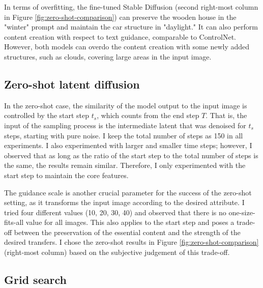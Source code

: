 In terms of overfitting, the fine-tuned Stable Diffusion (second right-most column in Figure \ref{fig:zero-shot-comparison}) can preserve the wooden house in the "winter" prompt and maintain the car structure in "daylight." It can also perform content creation with respect to text guidance, comparable to ControlNet. However, both models can overdo the content creation with some newly added structures, such as clouds, covering large areas in the input image.

\subsection{Zero-shot latent diffusion}
In the zero-shot case, the similarity of the model output to the input image is controlled by the start step  $t_s$, which counts from the end step  $T$. That is, the input of the sampling process is the intermediate latent that was denoised for $t_s$ steps, starting with pure noise. I keep the total number of steps as 150 in all experiments. I also experimented with larger and smaller time steps; however, I observed that as long as the ratio of the start step to the total number of steps is the same, the results remain similar. Therefore, I only experimented with the start step to maintain the core features.


The guidance scale is another crucial parameter for the success of the zero-shot setting, as it transforms the input image according to the desired attribute. I tried four different values (10, 20, 30, 40) and observed that there is no one-size-fits-all value for all images. This also applies to the start step and poses a trade-off between the preservation of the essential content and the strength of the desired transfers. I chose the zero-shot results in Figure \ref{fig:zero-shot-comparison}  (right-most column) based on the subjective judgement of this trade-off.

\subsection{Grid search}

